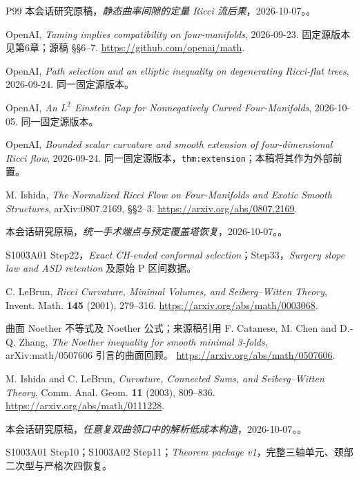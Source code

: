 \documentclass[UTF8,11pt,openany,oneside,fontset=none]{ctexbook}
\begin{document}
\begin{thebibliography}{P99}
 本会话研究原稿，\emph{静态曲率间隙的定量 Ricci 流后果}，2026-10-07。。

 OpenAI, \emph{Taming implies compatibility on four-manifolds}, 2026-09-23. 固定源版本见第6章；源稿 §§6--7. \url{https://github.com/openai/math}.

 OpenAI, \emph{Path selection and an elliptic inequality on degenerating Ricci-flat trees}, 2026-09-24. 同一固定源版本。

 OpenAI, \emph{An $L^2$ Einstein Gap for Nonnegatively Curved Four-Manifolds}, 2026-10-05. 同一固定源版本。

 OpenAI, \emph{Bounded scalar curvature and smooth extension of four-dimensional Ricci flow}, 2026-09-24. 同一固定源版本，\texttt{thm:extension}；本稿将其作为外部前置。

 M. Ishida, \emph{The Normalized Ricci Flow on Four-Manifolds and Exotic Smooth Structures}, arXiv:0807.2169, §§2--3. \url{https://arxiv.org/abs/0807.2169}.

 本会话研究原稿，\emph{统一手术端点与预定覆盖塔恢复}，2026-10-07。。

 S1003A01 Step22，\emph{Exact CH-ended conformal selection}；Step33，\emph{Surgery slope law and ASD retention} 及原始 P 区间数据。

 C. LeBrun, \emph{Ricci Curvature, Minimal Volumes, and Seiberg--Witten Theory}, Invent. Math. \textbf{145} (2001), 279--316. \url{https://arxiv.org/abs/math/0003068}.

 曲面 Noether 不等式及 Noether 公式；来源稿引用 F. Catanese, M. Chen and D.-Q. Zhang, \emph{The Noether inequality for smooth minimal 3-folds}, arXiv:math/0507606 引言的曲面回顾。 \url{https://arxiv.org/abs/math/0507606}.

 M. Ishida and C. LeBrun, \emph{Curvature, Connected Sums, and Seiberg--Witten Theory}, Comm. Anal. Geom. \textbf{11} (2003), 809--836. \url{https://arxiv.org/abs/math/0111228}.

 本会话研究原稿，\emph{任意复双曲领口中的解析低成本构造}，2026-10-07。。

 S1003A01 Step10；S1003A02 Step11；\emph{Theorem package v1}，完整三轴单元、颈部二次型与严格次四恢复。


\end{thebibliography}
\end{document}
